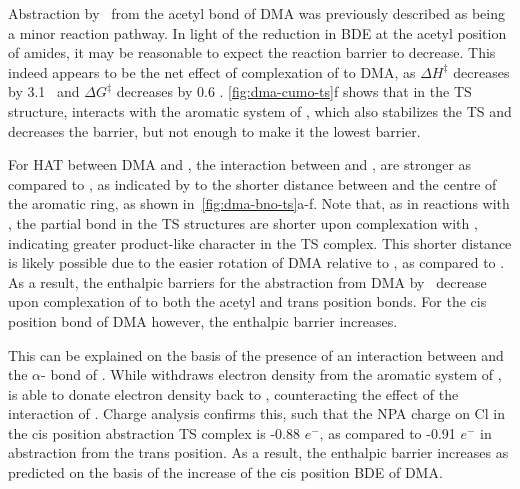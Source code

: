 \begin{doublespace}
Abstraction by \cumo\ from the acetyl  bond of DMA was previously
described as being a minor reaction pathway.\cite{Salamone2013} In light of the
reduction in BDE at the acetyl position of amides, it may be reasonable to
expect the reaction barrier to decrease. This indeed appears to be the net
effect of complexation of  to DMA, as $\Delta H^\ddagger$ decreases by
3.1 \kcalmol\ and $\Delta G^\ddagger$ decreases by 0.6 \kcalmol.
\ref{fig:dma-cumo-ts}f shows that in the TS structure,  interacts with
the aromatic system of \cumo, which also stabilizes the TS and decreases the
barrier, but not enough to make it the lowest barrier.

For HAT between DMA and \bno, the interaction between  and \bno, are
stronger as compared to \cumo, as indicated by to the shorter distance between
 and the centre of the aromatic ring, as shown
in~\ref{fig:dma-bno-ts}a-f. Note that, as in reactions with \cumo, the 
partial bond in the TS structures are shorter upon complexation with ,
indicating greater product-like character in the TS complex. This shorter
distance is likely possible due to the easier rotation of DMA relative to \bno,
as compared to \cumo. As a result, the enthalpic barriers for the abstraction
from DMA by \bno\ decrease upon complexation of  to both the acetyl and
trans position  bonds. For the cis position  bond of DMA
however, the enthalpic barrier increases.

This can be explained on the basis of the presence of an interaction between
 and the $\alpha$- bond of \bno. While  withdraws electron
density from the aromatic system of \bno,  is able to donate electron
density back to \bno, counteracting the effect of the interaction of .
Charge analysis confirms this, such that the NPA charge on Cl in the cis
position abstraction TS complex is -0.88 $e^-$, as compared to -0.91 $e^-$ in
abstraction from the trans position. As a result, the enthalpic barrier
increases as predicted on the basis of the increase of the cis position 
BDE of DMA.


\end{doublespace}
